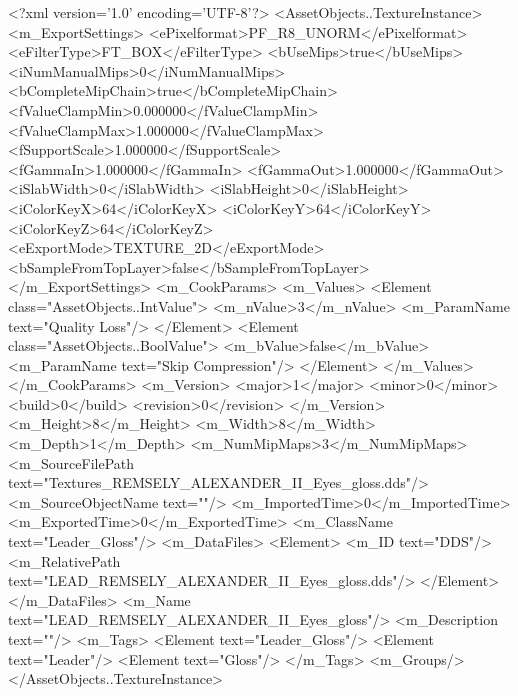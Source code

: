 <?xml version='1.0' encoding='UTF-8'?>
<AssetObjects..TextureInstance>
  <m_ExportSettings>
    <ePixelformat>PF_R8_UNORM</ePixelformat>
    <eFilterType>FT_BOX</eFilterType>
    <bUseMips>true</bUseMips>
    <iNumManualMips>0</iNumManualMips>
    <bCompleteMipChain>true</bCompleteMipChain>
    <fValueClampMin>0.000000</fValueClampMin>
    <fValueClampMax>1.000000</fValueClampMax>
    <fSupportScale>1.000000</fSupportScale>
    <fGammaIn>1.000000</fGammaIn>
    <fGammaOut>1.000000</fGammaOut>
    <iSlabWidth>0</iSlabWidth>
    <iSlabHeight>0</iSlabHeight>
    <iColorKeyX>64</iColorKeyX>
    <iColorKeyY>64</iColorKeyY>
    <iColorKeyZ>64</iColorKeyZ>
    <eExportMode>TEXTURE_2D</eExportMode>
    <bSampleFromTopLayer>false</bSampleFromTopLayer>
  </m_ExportSettings>
  <m_CookParams>
    <m_Values>
      <Element class="AssetObjects..IntValue">
        <m_nValue>3</m_nValue>
        <m_ParamName text="Quality Loss"/>
      </Element>
      <Element class="AssetObjects..BoolValue">
        <m_bValue>false</m_bValue>
        <m_ParamName text="Skip Compression"/>
      </Element>
    </m_Values>
  </m_CookParams>
  <m_Version>
    <major>1</major>
    <minor>0</minor>
    <build>0</build>
    <revision>0</revision>
  </m_Version>
  <m_Height>8</m_Height>
  <m_Width>8</m_Width>
  <m_Depth>1</m_Depth>
  <m_NumMipMaps>3</m_NumMipMaps>
  <m_SourceFilePath text="Textures\LEAD_REMSELY_ALEXANDER_II_Eyes_gloss.dds"/>
  <m_SourceObjectName text=""/>
  <m_ImportedTime>0</m_ImportedTime>
  <m_ExportedTime>0</m_ExportedTime>
  <m_ClassName text="Leader_Gloss"/>
  <m_DataFiles>
    <Element>
      <m_ID text="DDS"/>
      <m_RelativePath text="LEAD_REMSELY_ALEXANDER_II_Eyes_gloss.dds"/>
    </Element>
  </m_DataFiles>
  <m_Name text="LEAD_REMSELY_ALEXANDER_II_Eyes_gloss"/>
  <m_Description text=""/>
  <m_Tags>
    <Element text="Leader_Gloss"/>
    <Element text="Leader"/>
    <Element text="Gloss"/>
  </m_Tags>
  <m_Groups/>
</AssetObjects..TextureInstance>
